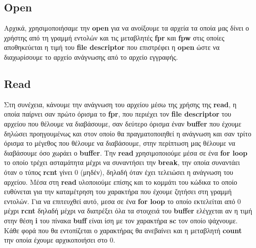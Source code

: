 \documentclass[12pt]{article}
\begin{document}
\subsection{\foreignlanguage{english}{Open}}
Αρχικά, χρησιμοποιήσαμε την \textbf{\foreignlanguage{english}{open}} για να
ανοίξουμε τα αρχεία τα οποία μας δίνει ο χρήστης από τη
γραμμή εντολών και τις μεταβλητές \textbf{\foreignlanguage{english}{fpr}} και
\textbf{\foreignlanguage{english}{fpw}} στις οποίες αποθηκεύεται
η τιμή του \textbf{\foreignlanguage{english}{file descriptor}} που επιστρέφει η
\textbf{\foreignlanguage{english}{open}} ώστε να διαχωρίσουμε
το αρχείο ανάγνωσης από το αρχείο εγγραφής.

\subsection{\foreignlanguage{english}{Read}}
Στη συνέχεια,  κάνουμε την ανάγνωση του αρχείου μέσω της χρήσης της
\textbf{\foreignlanguage{english}{read}}, η οποία παίρνει σαν πρώτο
όρισμα το \textbf{\foreignlanguage{english}{fpr}}, που περιέχει τον
\textbf{\foreignlanguage{english}{file descriptor}} του αρχείου που θέλουμε να
διαβάσουμε, σαν δεύτερο όρισμα έναν \textbf{\foreignlanguage{english}{buffer}}
που έχουμε δηλώσει προηγουμένως και στον οποίο θα πραγματοποιηθεί
η ανάγνωση και σαν τρίτο όρισμα το μέγεθος που θέλουμε να διαβάσουμε, στην
περίπτωση μας θέλουμε να διαβάσουμε όσο χωράει ο
\textbf{\foreignlanguage{english}{buffer}}. Την
\textbf{\foreignlanguage{english}{read}} χρησιμοποιούμε μέσα σε ένα
\textbf{\foreignlanguage{english}{for loop}}
το οποίο τρέχει ασταμάτητα μέχρι να συναντήσει την
\textbf{\foreignlanguage{english}{break}}, την οποία συναντάει όταν ο τύπος
\textbf{\foreignlanguage{english}{rcnt}} γίνει 0 (μηδέν), δηλαδή όταν έχει
τελειώσει η ανάγνωση του αρχείου.
Μέσα στη \textbf{\foreignlanguage{english}{read}} υλοποιούμε επίσης και το
κομμάτι του κώδικα το οποίο ευθύνεται για την καταμέτρηση του χαρακτήρα
που έχουμε ζητήσει στη γραμμή εντολών. Για να επιτευχθεί αυτό, μεσα σε ένα
\textbf{\foreignlanguage{english}{for loop}} το οποίο εκτελείται από 0
μέχρι \textbf{\foreignlanguage{english}{rcnt}} δηλαδή μέχρι να διατρέξει όλα τα
στοιχειά του \textbf{\foreignlanguage{english}{buffer}} ελέγχεται αν η τιμή
στην θέση \textbf{\foreignlanguage{english}{i}} του πίνακα
\textbf{\foreignlanguage{english}{buff}} είναι ίση με τον χαρακτήρα
\textbf{\foreignlanguage{english}{sc}}
τον οποίο ψάχνουμε.
Κάθε φορά που θα εντοπίζεται ο χαρακτήρας θα ανεβαίνει και η μεταβλητή
\textbf{\foreignlanguage{english}{count}} την οποία έχουμε αρχικοποιήσει στο 0.
\end{document}

